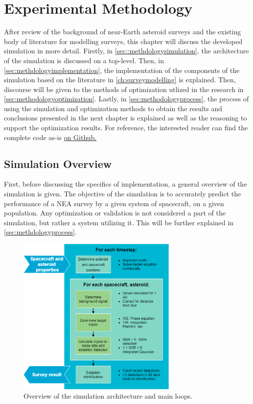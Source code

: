\chapter{Experimental Methodology}
After review of the background of near-Earth asteroid surveys and the existing body of literature for modelling surveys, this chapter will discuss the developed simulation in more detail. Firstly, in \autoref{sec::methdologysimulation}, the architecture of the simulation is discussed on a top-level. Then, in \autoref{sec:methdologyimplementation}, the implementation of the components of the simulation based on the literature in \autoref{ch:surveymodelling} is explained. Then, discourse will be given to the methods of optimization utlized in the research in \autoref{sec:methodologyoptimization}. Lastly, in \autoref{sec:methodologyprocess}, the process of using the simulation and optimization methods to obtain the results and conclusions presented in the next chapter is explained as well as the reasoning to support the optimization results. For reference, the interested reader can find the complete code as-is \href{https://github.com/ArjanVermeulen97/thesis/tree/main/code}{on Github.}

\section{Simulation Overview}
\label{sec:methodologysimulation}
First, before discussing the specifics of implementation, a general overview of the simulation is given. The objective of the simulation is to accurately predict the performance of a NEA survey by a given system of spacecraft, on a given population. Any optimization or validation is not considered a part of the simulation, but rather a system utilizing it. This will be further explained in \autoref{sec:methdologyprocess}.

\begin{figure}[htbp]
 \centering
 \includegraphics[width=0.7\textwidth]{img/simulation_overview.png}
 \caption{Overview of the simulation architecture and main loops.}
 \label{fig:simulation_overview}
\end{figure}

